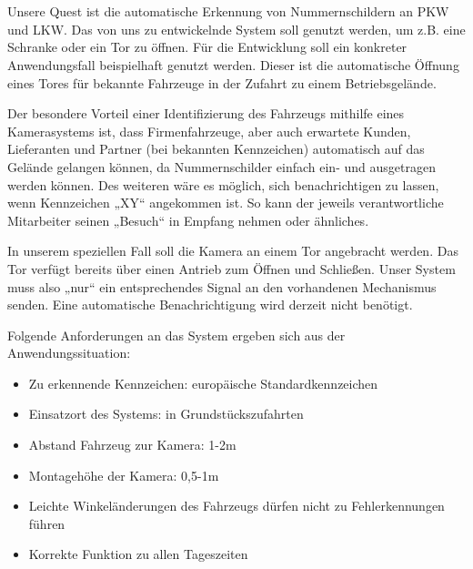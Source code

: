 \documentclass{../Vorlage/sebDenCls}
\begin{document}


\section{}
Unsere Quest ist die automatische Erkennung von Nummernschildern an PKW und LKW. Das von uns zu entwickelnde System soll genutzt werden, um z.B. eine Schranke oder ein Tor zu öffnen. Für die Entwicklung soll ein konkreter Anwendungsfall beispielhaft genutzt werden. Dieser ist die automatische Öffnung eines Tores für bekannte Fahrzeuge in der Zufahrt zu einem Betriebsgelände. 

Der besondere Vorteil einer Identifizierung des Fahrzeugs mithilfe eines Kamerasystems ist, dass Firmenfahrzeuge, aber auch erwartete Kunden, Lieferanten und Partner (bei bekannten Kennzeichen) automatisch auf das Gelände gelangen können, da Nummernschilder einfach ein- und ausgetragen werden können. Des weiteren wäre es möglich, sich benachrichtigen zu lassen, wenn Kennzeichen „XY“ angekommen ist. So kann der jeweils verantwortliche Mitarbeiter seinen „Besuch“ in Empfang nehmen oder ähnliches. 

In unserem speziellen Fall soll die Kamera an einem Tor angebracht werden. Das Tor verfügt bereits über einen Antrieb zum Öffnen und Schließen. Unser System muss also „nur“ ein entsprechendes Signal an den vorhandenen Mechanismus senden. Eine automatische Benachrichtigung wird derzeit nicht benötigt. 

Folgende Anforderungen an das System ergeben sich aus der Anwendungssituation:
\begin{itemize}
\item Zu erkennende Kennzeichen: europäische Standardkennzeichen
\item Einsatzort des Systems: in Grundstückszufahrten
\item Abstand Fahrzeug zur Kamera: 1-2m
\item Montagehöhe der Kamera: 0,5-1m
\item Leichte Winkeländerungen des Fahrzeugs dürfen nicht zu Fehlerkennungen führen
\item Korrekte Funktion zu allen Tageszeiten
\end{itemize}	

\newpage
\section{}
\end{document}
